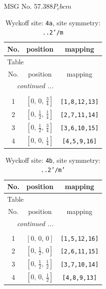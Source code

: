 \documentclass[fleqn,8pt]{jsarticle}
\begin{document}
\setcounter{MaxMatrixCols}{32}

\renewcommand{\tablename}{Table~}
\renewcommand{\figurename}{Figure~}
\begin{center}
\LARGE
MSG No. 57.388\quad$P_{c}bcm$
\end{center}
\renewcommand{\arraystretch}{1.2}
\begin{longtable}{ccc}
\caption{Wyckoff site: {\tt 4a}, site symmetry: {\tt ..2'/m}}
 \\
 \hline \hline
No. & position & mapping \\ \hline \endfirsthead

\multicolumn{2}{l}{\tablename\ \thetable{}} \\
 \hline \hline
No. & position & mapping \\ \hline \endhead

 \hline \hline
\multicolumn{2}{r}{\footnotesize\it continued ...} \\ \endfoot

 \hline \hline
\multicolumn{2}{r}{} \\ \endlastfoot

1 & $\left[ 0,\, 0,\, \frac{3}{4} \right]$ & {\tt [1,8,12,13]} \\ \hline
2 & $\left[ 0,\, \frac{1}{2},\, \frac{1}{4} \right]$ & {\tt [2,7,11,14]} \\ \hline
3 & $\left[ 0,\, \frac{1}{2},\, \frac{3}{4} \right]$ & {\tt [3,6,10,15]} \\ \hline
4 & $\left[ 0,\, 0,\, \frac{1}{4} \right]$ & {\tt [4,5,9,16]} \\
\end{longtable}
\renewcommand{\arraystretch}{1.2}
\begin{longtable}{ccc}
\caption{Wyckoff site: {\tt 4b}, site symmetry: {\tt ..2'/m'}}
 \\
 \hline \hline
No. & position & mapping \\ \hline \endfirsthead

\multicolumn{2}{l}{\tablename\ \thetable{}} \\
 \hline \hline
No. & position & mapping \\ \hline \endhead

 \hline \hline
\multicolumn{2}{r}{\footnotesize\it continued ...} \\ \endfoot

 \hline \hline
\multicolumn{2}{r}{} \\ \endlastfoot

1 & $\left[ 0,\, 0,\, 0 \right]$ & {\tt [1,5,12,16]} \\ \hline
2 & $\left[ 0,\, \frac{1}{2},\, 0 \right]$ & {\tt [2,6,11,15]} \\ \hline
3 & $\left[ 0,\, \frac{1}{2},\, \frac{1}{2} \right]$ & {\tt [3,7,10,14]} \\ \hline
4 & $\left[ 0,\, 0,\, \frac{1}{2} \right]$ & {\tt [4,8,9,13]} \\
\end{longtable}
\end{document}

